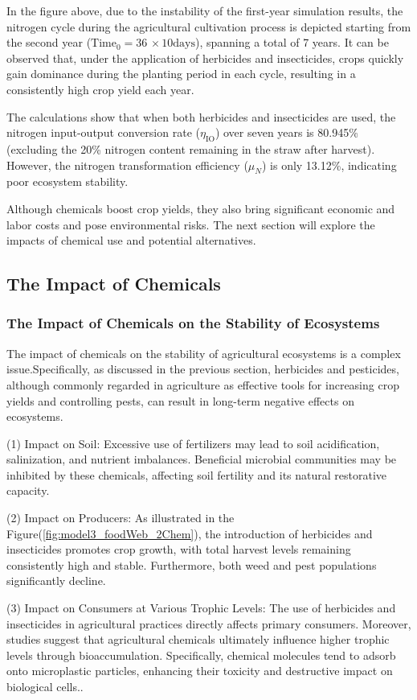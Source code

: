 \documentclass{mcmthesis}
\begin{document}
In the figure above, due to the instability of the first-year simulation results, the nitrogen cycle during the agricultural cultivation process is depicted starting from the second year ($\text{Time}_0 = 36 \, \times 10 \text{days}$), spanning a total of 7 years. It can be observed that, under the application of herbicides and insecticides, crops quickly gain dominance during the planting period in each cycle, resulting in a consistently high crop yield each year. 

The calculations show that when both herbicides and insecticides are used, the nitrogen input-output conversion rate (\(\eta_{\text{IO}}\)) over seven years is 80.945\% (excluding the 20\% nitrogen content remaining in the straw after harvest). However, the nitrogen transformation efficiency (\(\mu_N\)) is only 13.12\%, indicating poor ecosystem stability.

Although chemicals boost crop yields, they also bring significant economic and labor costs and pose environmental risks. The next section will explore the impacts of chemical use and potential alternatives.
\subsection{The Impact of Chemicals}
\subsubsection{The Impact of Chemicals on the Stability of Ecosystems}
The impact of chemicals on the stability of agricultural ecosystems is a complex issue.Specifically, as discussed in the previous section, herbicides and pesticides, although commonly regarded in agriculture as effective tools for increasing crop yields and controlling pests, can result in long-term negative effects on ecosystems. 

(1) Impact on Soil: Excessive use of fertilizers may lead to soil acidification, salinization, and nutrient imbalances. Beneficial microbial communities may be inhibited by these chemicals, affecting soil fertility and its natural restorative capacity. 

(2) Impact on Producers: As illustrated in the Figure(\ref{fig:model3_foodWeb_2Chem}), the introduction of herbicides and insecticides promotes crop growth, with total harvest levels remaining consistently high and stable. Furthermore, both weed and pest populations significantly decline. 

(3) Impact on Consumers at Various Trophic Levels: The use of herbicides and insecticides in agricultural practices directly affects primary consumers. Moreover, studies suggest that agricultural chemicals ultimately influence higher trophic levels through bioaccumulation. Specifically, chemical molecules tend to adsorb onto microplastic particles, enhancing their toxicity and destructive impact on biological cells.\cite{bioaccumulation}.
\end{document}
